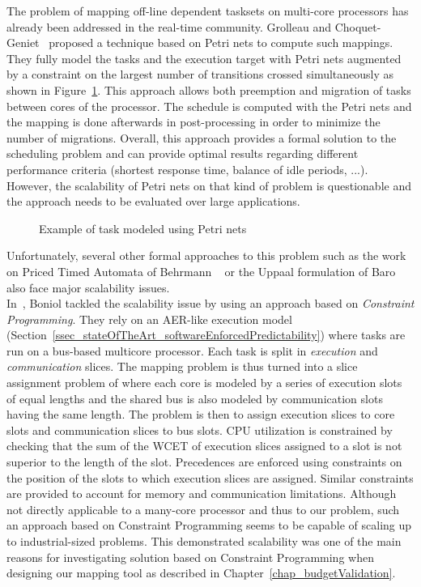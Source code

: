 \documentclass[main.tex]{subfiles}
\begin{document}
The problem of mapping off-line dependent tasksets on multi-core processors has already been addressed in the real-time community. Grolleau and Choquet-Geniet~\cite{Grolleau2001} proposed a technique based on Petri nets to compute such mappings. They fully model the tasks and the execution target with Petri nets augmented by a constraint on the largest number of transitions crossed simultaneously as shown in Figure~\ref{fig_stateOfTheArt_2_taskPetriNet}. This approach allows both preemption and migration of tasks between cores of the processor. The schedule is computed with the Petri nets and the mapping is done afterwards in post-processing in order to minimize the number of migrations. Overall, this approach provides a formal solution to the scheduling problem and can provide optimal results regarding different performance criteria (shortest response time, balance of idle periods, ...). However, the scalability of Petri nets on that kind of problem is questionable and the approach needs to be evaluated over large applications. 

\begin{figure}
    \centering
    \scalebox{0.9}{}
    \caption{Example of task modeled using Petri nets}
    \label{fig_stateOfTheArt_2_taskPetriNet}
\end{figure}

Unfortunately, several other formal approaches to this problem such as the work on Priced Timed Automata of Behrmann \etal~\cite{Behrmann2005} or the {\sc Uppaal} formulation of Baro \etal~\cite{Baro2012} also face major scalability issues.\\

In~\cite{Boniol2008}, Boniol \etal tackled the scalability issue by using an approach based on \emph{Constraint Programming}. They rely on an AER-like execution model (Section~\ref{ssec_stateOfTheArt_softwareEnforcedPredictability}) where tasks are run on a bus-based multicore processor. Each task is split in \emph{execution} and \emph{communication} slices. The mapping problem is thus turned into a slice assignment problem of where each core is modeled by a series of execution slots of equal lengths and the shared bus is also modeled by communication slots having the same length. The problem is then to assign execution slices to core slots and communication slices to bus slots. CPU utilization is constrained by checking that the sum of the WCET of execution slices assigned to a slot is not superior to the length of the slot. Precedences are enforced using constraints on the position of the slots to which execution slices are assigned. Similar constraints are provided to account for memory and communication limitations. Although not directly applicable to a many-core processor and thus to our problem, such an approach based on Constraint Programming seems to be capable of scaling up to industrial-sized problems. This demonstrated scalability was one of the main reasons for investigating solution based on Constraint Programming when designing our mapping tool as described in Chapter~\ref{chap_budgetValidation}.
\end{document}
